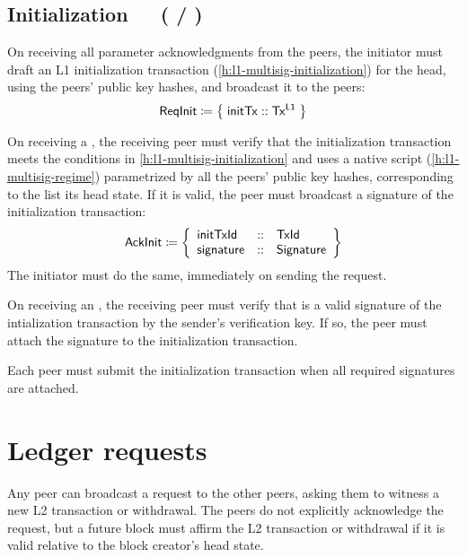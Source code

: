\documentclass[../hydrozoa.tex]{subfiles}
\begin{document}
\subsection{Initialization~~~( / )}%
\label{h:l2-consensus-intitialization}%

On receiving all parameter acknowledgments from the peers, the initiator must draft an L1 initialization transaction (\cref{h:l1-multisig-initialization}) for the head, using the peers' public key hashes, and broadcast it to the peers:
\begin{equation*}
  \mathsf{ReqInit} \coloneq \;\bigr\{\; \mathsf{initTx} :: \mathsf{Tx^{L1}} \;\bigr\}
\end{equation*}

On receiving a , the receiving peer must verify that the initialization transaction meets the conditions in \cref{h:l1-multisig-initialization} and uses a native script (\cref{h:l1-multisig-regime}) parametrized by all the peers' public key hashes, corresponding to the  list its head state.
If it is valid, the peer must broadcast a signature of the initialization transaction:
\begin{equation*}
  \mathsf{AckInit} \coloneq \left\{
  \begin{array}{lll}
    \mathsf{initTxId} &::& \mathsf{TxId} \\
    \mathsf{signature} &::& \mathsf{Signature}
  \end{array}\right\}
\end{equation*}
The initiator must do the same, immediately on sending the  request.

On receiving an , the receiving peer must verify that  is a valid signature of the intialization transaction by the sender's verification key.
If so, the peer must attach the signature to the initialization transaction.

Each peer must submit the initialization transaction when all required signatures are attached.

\section{Ledger requests}%
\label{h:l2-consensus-ledger}%

Any peer can broadcast a request to the other peers, asking them to witness a new L2 transaction or withdrawal.
The peers do not explicitly acknowledge the request, but a future block must affirm the L2 transaction or withdrawal if it is valid relative to the block creator's head state.
\end{document}
